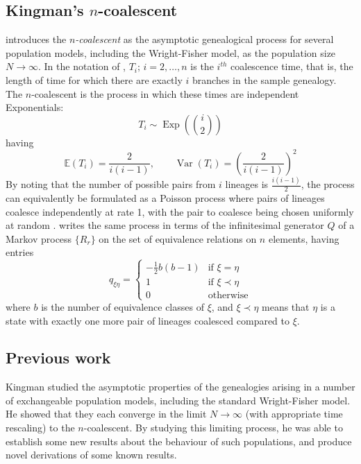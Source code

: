 \documentclass{article}
\newcommand{\E}{\mathbb{E}}
\newcommand{\V}{\operatorname{Var}}
\begin{document}
\subsection{Kingman's $n$-coalescent}
\citet{kingman1982gene} introduces the \emph{$n$-coalescent} as the asymptotic genealogical process for several population models, including the Wright-Fisher model, as the population size $N\to\infty$.
In the notation of \citet{wakeley2009}, $T_i;\, i=2,\dots,n$ is the $i^{th}$ coalescence time, that is, the length of time for which there are exactly $i$ branches in the sample genealogy. The $n$-coalescent is the process in which these times are independent Exponentials:
\begin{equation*}
T_i \sim \operatorname{Exp}\left(\binom{i}{2}\right)
\end{equation*}
having
\begin{equation*}
\E(T_i) = \frac{2}{i(i-1)}, \qquad \V(T_i) = \left( \frac{2}{i(i-1)} \right)^2
\end{equation*}
By noting that the number of possible pairs from $i$ lineages is $\frac{i(i-1)}{2}$, the process can equivalently be formulated as a Poisson process where pairs of lineages coalesce independently at rate 1, with the pair to coalesce being chosen uniformly at random \citep[Section 3.2]{wakeley2009}.
\citet{mohle1998} writes the same process in terms of the infinitesimal generator $Q$ of a Markov process $\{R_r\}$ on the set of equivalence relations on $n$ elements, having entries
\begin{equation*}
q_{\xi\eta} =
\begin{cases}
-\frac{1}{2}b(b-1) &\text{if }\xi=\eta \\
1 & \text{if }\xi \prec\eta \\
0 & \text{otherwise}
\end{cases}
\end{equation*}
where $b$ is the number of equivalence classes of $\xi$, and $\xi \prec \eta$ means that $\eta$ is a state with exactly one more pair of lineages coalesced compared to $\xi$.

\subsection{Previous work}\label{sec:previous}
Kingman \citep{kingman1982gene, kingman1982coal, kingman1982exch} studied the asymptotic properties of the genealogies arising in a number of exchangeable population models, including the standard Wright-Fisher model. He showed that they each converge in the limit $N\to\infty$ (with appropriate time rescaling) to the $n$-coalescent. By studying this limiting process, he was able to establish some new results about the behaviour of such populations, and produce novel derivations of some known results.
\end{document}
